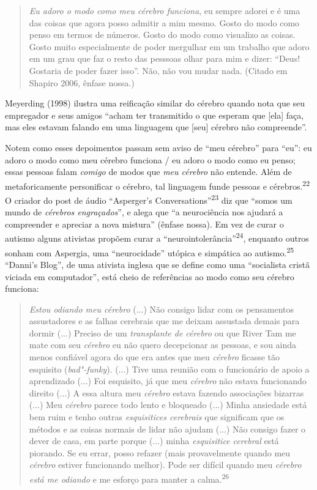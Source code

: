 \begin{quote}
\emph{Eu adoro o modo como meu cérebro funciona}, eu sempre adorei e é
uma das coisas que agora posso admitir a mim mesmo. Gosto do modo como
penso em termos de números. Gosto do modo como visualizo as coisas.
Gosto muito especialmente de poder mergulhar em um trabalho que adoro em
um grau que faz o resto das pesssoas olhar para mim e dizer: ``Deus!
Gostaria de poder fazer isso''. Não, não vou mudar nada. (Citado em
Shapiro 2006, ênfase nossa.)
\end{quote}

Meyerding (1998) ilustra uma reificação similar do cérebro quando nota
que seu empregador e seus amigos ``acham ter transmitido o que esperam
que {[}ela{]} faça, mas eles estavam falando em uma linguagem que
{[}seu{]} cérebro não compreende''.

Notem como esses depoimentos passam sem aviso de ``meu cérebro'' para
``eu'': eu adoro o modo como meu cérebro funciona / eu adoro o modo como
eu penso; essas pessoas falam \emph{comigo} de modos que \emph{meu
cérebro} não entende. Além de metaforicamente personificar o cérebro,
tal linguagem funde pessoas e cérebros.\textsuperscript{22} O criador do
post de áudio ``Asperger's Conversations''\textsuperscript{23} diz que
``somos um mundo de \emph{cérebros engraçados}'', e alega que ``a
neurociência nos ajudará a compreender e apreciar a nova mistura''
(ênfase nossa). Em vez de curar o autismo alguns ativistas propõem curar
a ``neurointolerância''\textsuperscript{24}, enquanto outros sonham com
Aspergia, uma ``neurocidade'' utópica e simpática ao
autismo.\textsuperscript{25} ``Danni's Blog'', de uma ativista inglesa
que se define como uma ``socialista cristã viciada em computador'', está
cheio de referências ao modo como seu cérebro funciona:

\begin{quote}
\emph{Estou odiando meu cérebro} (...) Não consigo lidar com os
pensamentos assustadores e as falhas cerebrais que me deixam assustada
demais para dormir (...) Preciso de um \emph{transplante de cérebro} ou
que River Tam me mate com seu \emph{cérebro} eu não quero decepcionar as
pessoas, e sou ainda menos confiável agora do que era antes que meu
\emph{cérebro} ficasse tão esquisito (\emph{bad"-funky}). (...) Tive uma
reunião com o funcionário de apoio a aprendizado (...) Foi esquisito, já
que meu \emph{cérebro} não estava funcionando direito (...) A essa
altura meu \emph{cérebro} estava fazendo associações bizarras (...) Meu
\emph{cérebro} parece todo lento e bloqueado (...) Minha ansiedade está
bem ruim e tenho outras \emph{esquisitices cerebrais} que significam que
os métodos e as coisas normais de lidar não ajudam (...) Não consigo
fazer o dever de casa, em parte porque (...) minha \emph{esquisitice
cerebral} está piorando. Se eu errar, posso refazer (mais provavelmente
quando meu \emph{cérebro} estiver funcionando melhor). Pode ser difícil
quando meu \emph{cérebro está me odiando} e me esforço para manter a
calma.\textsuperscript{26}
\end{quote}


